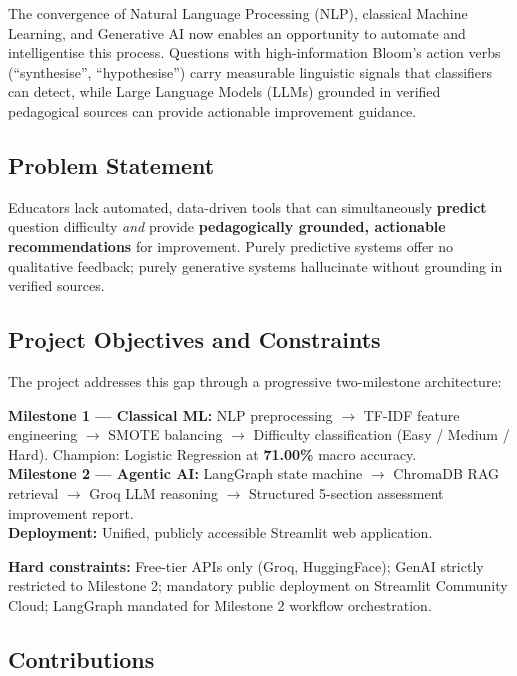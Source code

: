 \documentclass[12pt,a4paper]{article}
\begin{document}
The convergence of Natural Language Processing (NLP), classical Machine Learning, and
Generative AI now enables an opportunity to automate and intelligentise this process.
Questions with high-information Bloom's action verbs (``synthesise'', ``hypothesise'')
carry measurable linguistic signals that classifiers can detect, while Large Language Models
(LLMs) grounded in verified pedagogical sources can provide actionable improvement guidance.

\subsection{Problem Statement}

Educators lack automated, data-driven tools that can simultaneously \textbf{predict} question
difficulty \emph{and} provide \textbf{pedagogically grounded, actionable recommendations}
for improvement. Purely predictive systems offer no qualitative feedback; purely generative
systems hallucinate without grounding in verified sources.

\subsection{Project Objectives and Constraints}

The project addresses this gap through a progressive two-milestone architecture:

\begin{tealbox}
\textbf{Milestone 1 --- Classical ML:}
NLP preprocessing $\to$ TF-IDF feature engineering $\to$ SMOTE balancing $\to$
Difficulty classification (Easy / Medium / Hard). Champion: Logistic Regression at
\textbf{71.00\%} macro accuracy.\\[4pt]
\textbf{Milestone 2 --- Agentic AI:}
LangGraph state machine $\to$ ChromaDB RAG retrieval $\to$ Groq LLM reasoning $\to$
Structured 5-section assessment improvement report.\\[4pt]
\textbf{Deployment:} Unified, publicly accessible Streamlit web application.
\end{tealbox}

\textbf{Hard constraints:} Free-tier APIs only (Groq, HuggingFace); GenAI strictly
restricted to Milestone 2; mandatory public deployment on Streamlit Community Cloud;
LangGraph mandated for Milestone 2 workflow orchestration.

\subsection{Contributions}
\end{document}
